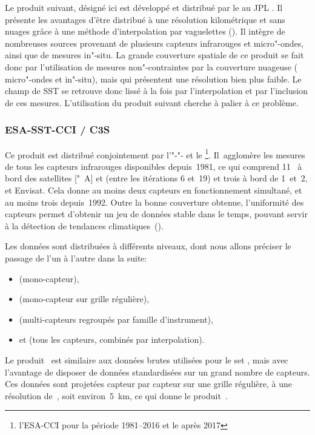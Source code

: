 Le produit suivant, désigné ici  est développé et distribué par le  au JPL  .
Il présente les avantages d'être distribué à une résolution kilométrique et sans nuages grâce à une méthode d'interpolation par vaguelettes (\cite{chin_2017}).
Il intègre de nombreuses sources provenant de plusieurs capteurs infrarouges et micro"-ondes, ainsi que de mesures in"-situ.
La grande couverture spatiale de ce produit se fait donc par l'utilisation de mesures non"-contraintes par la couverture nuageuse ( micro"-ondes et in"-situ), mais qui présentent une résolution bien plus faible.
Le champ de SST se retrouve donc lissé à la fois par l'interpolation et par l'inclusion de ces mesures.
L'utilisation du produit suivant cherche à palier à ce problème.

\subsubsection{ESA-SST-CCI / C3S}

Ce produit est distribué conjointement par l'"-"- et le \footnote{%
  l'ESA-CCI pour la période 1981--2016 et le  après 2017}.
Il~agglomère les mesures de tous les capteurs infrarouges disponibles depuis~1981, ce qui comprend 11~ à bord des satellites ["~A] et  (entre les itérations 6 et~19) et trois  à bord de  1~et~2, et Envisat. 
Cela donne au moins deux capteurs en fonctionnement simultané, et au moins trois depuis~1992.
Outre la bonne couverture obtenue, l'uniformité des capteurs permet d'obtenir un jeu de données stable dans le temps, pouvant servir à la détection de tendances climatiques~(\cite{merchant_2019}).

Les données sont distribuées à différents niveaux, dont nous allons préciser le passage de l'un à l'autre dans la suite:
\begin{itemize}
  \item {} (mono-capteur),
  \item {} (mono-capteur sur grille régulière),
  \item {} (multi-capteurs regroupés par famille d'instrument),
  \item et  (tous les capteurs, combinés par interpolation).
\end{itemize}

Le produit~ est similaire aux données brutes utilisées pour le set , mais avec l'avantage de disposer de données standardisées sur un grand nombre de capteurs.
Ces données sont projetées capteur par capteur sur une grille régulière, à une résolution de~, soit environ~\qty{5}{\km}, ce qui donne le produit~.


